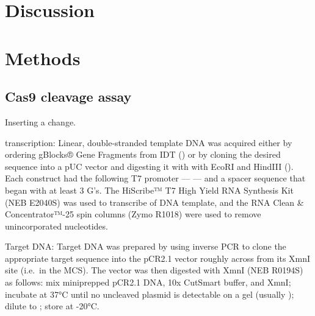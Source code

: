 \documentclass[10pt,oneside]{article}
\begin{document}





\section{Discussion}




\section{Methods}

\subsection{\Invitro{} Cas9 cleavage assay}

Inserting a change.

\Invitro{} transcription: Linear, double-stranded template DNA was acquired 
either by ordering gBlocks® Gene Fragments from IDT () or by cloning 
the desired sequence into a pUC vector and digesting it with with EcoRI and 
HindIII ().  Each construct had the following T7 promoter --- 
 --- and a spacer sequence that began with at 
least 3 G's.  The HiScribe™ T7 High Yield RNA Synthesis Kit (NEB E2040S) was 
used to transcribe  of DNA template, and the RNA Clean \& 
Concentrator™-25 spin columns (Zymo R1018) were used to remove unincorporated 
nucleotides.

Target DNA: Target DNA was prepared by using inverse PCR to clone the 
appropriate target sequence into the pCR2.1 vector roughly across from its XmnI 
site (i.e.\ in the MCS).  The vector was then digested with XmnI (NEB R0194S) 
as follows: mix   miniprepped pCR2.1 DNA,  10x 
CutSmart buffer, and   XmnI; incubate at 37°C until no 
uncleaved plasmid is detectable on a gel (usually ); dilute to 
; store at -20°C.  
\end{document}
